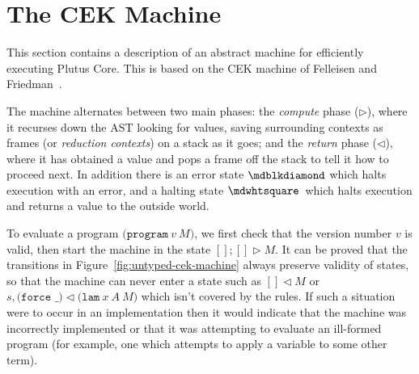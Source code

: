 \section{The CEK Machine}
This section contains a description of an abstract machine for efficiently
executing Plutus Core.  This is based on the CEK machine of Felleisen and
Friedman~\cite{Felleisen-CK-CEK}.

\noindent The machine alternates between two main phases: the
\textit{compute} phase ($\triangleright$), where it recurses down
the AST looking for values, saving surrounding contexts as frames (or
\textit{reduction contexts}) on a stack as it goes; and the
\textit{return} phase ($\triangleleft$), where it has obtained a value and
pops a frame off the stack to tell it how to proceed next.  In
addition there is an error state $\cekerror$ which halts execution
with an error, and a halting state $\cekhalt{}$ which halts execution and
returns a value to the outside world.%
%
%
%

To evaluate a program $\texttt{(program}\ v\ M \texttt{)}$, we first check that
the version number $v$ is valid, then start the machine in the state $[];[]
\triangleright M$.  It can be proved that the transitions in
Figure~\ref{fig:untyped-cek-machine} always preserve validity of states, so that
the machine can never enter a state such as $[] \triangleleft M$ or $s,
\texttt{(force \_)} \triangleleft \texttt{(lam}\ x\ A \ M\texttt{)}$ which isn't
covered by the rules.  If such a situation were to occur in an implementation
then it would indicate that the machine was incorrectly implemented or that it
was attempting to evaluate an ill-formed program (for example, one which attempts
to apply a variable to some other term).

